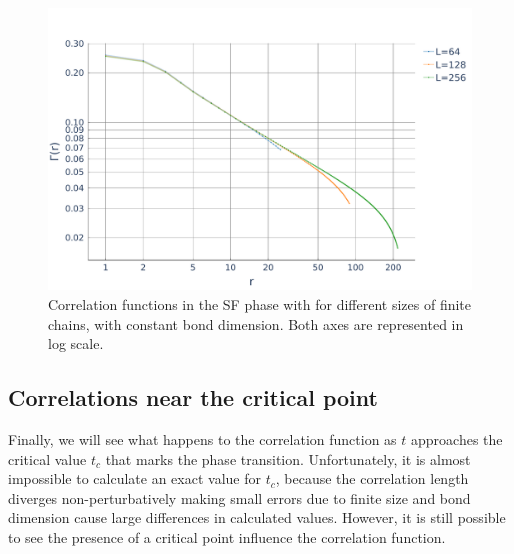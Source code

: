 \documentclass[twoside,twocolumn,9pt]{article}
\begin{document}
\begin{center}
  \begin{figure}
      \includegraphics[width=\linewidth]{../code/figures/Correlations-lengths.pdf}
      \caption{Correlation functions in the SF phase with for different sizes of finite chains, with constant bond dimension. Both axes are represented in log scale.}
      \label{fig:lengths}
  \end{figure}
\end{center}

\subsection{Correlations near the critical point}
Finally, we will see what happens to the correlation function as $t$ approaches the critical value $t_c$ that marks the phase transition. Unfortunately, it is almost impossible to calculate an exact value for $t_c$, because the correlation length diverges non-perturbatively making small errors due to finite size and bond dimension cause large differences in calculated values. However, it is still possible to see the presence of a critical point influence the correlation function. 
\end{document}
